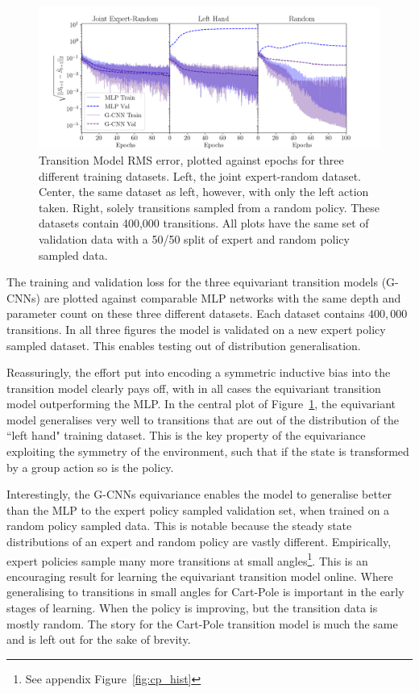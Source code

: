 \documentclass[mlabstract]{jmlr}
\begin{document}
\begin{figure}
	\centering
	\includegraphics[width=.65\textwidth]{Figures/transition_model_loss.png}
	\caption{Transition Model RMS error, plotted against epochs for three different training
		datasets. Left, the joint expert-random dataset. Center, the same dataset as
		left, however, with only the left action taken. Right, solely transitions sampled
		from a random policy. These datasets contain 400,000 transitions. All plots have
		the same set of validation data with a 50/50 split of expert and random policy
		sampled data.}\label{fig:tm_cp}
\end{figure}

The training and validation loss for the three equivariant transition models (G-CNNs) are plotted against comparable MLP networks with the same depth and parameter count on these three different datasets. Each dataset contains $400,000$ transitions. In all three figures the model is validated on a new expert policy sampled dataset. This enables testing out of distribution generalisation.

Reassuringly, the effort put into encoding a symmetric inductive bias into the transition model clearly pays off, with in all cases the equivariant transition model outperforming the MLP. In the central plot of Figure~\ref{fig:tm_cp}, the equivariant model generalises very well to transitions that are out of the distribution of the ``left hand" training dataset. This is the key property of the equivariance exploiting the symmetry of the environment, such that if the state is transformed by a group action so is the policy.

Interestingly, the G-CNNs equivariance enables the model to generalise better than the MLP to the expert policy sampled validation set, when trained on a random policy sampled data. This is notable because the steady state distributions of an expert and random policy are vastly different. Empirically, expert policies sample many more transitions at small angles\footnote{See appendix Figure~\ref{fig:cp_hist}}. This is an encouraging result for learning the equivariant transition model online. Where generalising to transitions in small angles for Cart-Pole is important in the early stages of learning. When the policy is improving, but the transition data is mostly random. The story for the Cart-Pole transition model is much the same and is left out for the sake of brevity.
\end{document}
